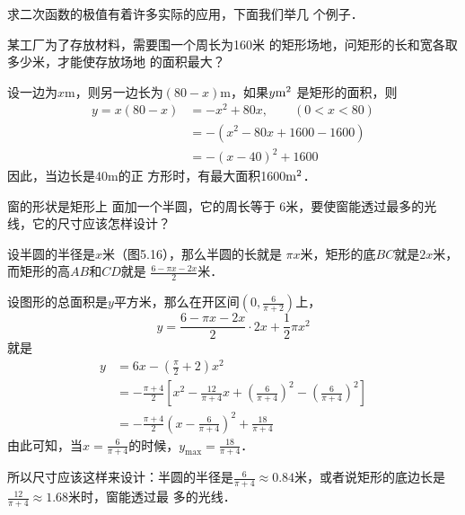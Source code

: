 求二次函数的极值有着许多实际的应用，下面我们举几
个例子．

\begin{example}
    某工厂为了存放材料，需要围一个周长为160米
的矩形场地，问矩形的长和宽各取多少米，才能使存放场地
的面积最大？
\end{example}

\begin{solution}
    设一边为$x$m，则另一边长为$(80-x)$m，如果$y{\rm m}^2$
是矩形的面积，则
\[\begin{split}
    y=x(80-x)&=-x^2+80x,\qquad (0<x<80)\\
    &=-(x^2-80x+1600-1600)\\
    &=-(x-40)^2+1600
\end{split}\]
因此，当边长是40m的正
方形时，有最大面积1600${\rm m}^2$．
\end{solution}

\begin{example}
    窗的形状是矩形上
面加一个半圆，它的周长等于
6米，要使窗能透过最多的光
线，它的尺寸应该怎样设计？
\end{example}

\begin{solution}
设半圆的半径是$x$米（图5.16），那么半圆的长就是
$\pi x$米，矩形的底$BC$就是$2x$米，而矩形的高$AB$和$CD$就是
$\frac{6-\pi x-2x}{2}$米．

\begin{figure}[htp]
    \centering
{}
    \caption{}
\end{figure}

设图形的总面积是$y$平方米，那么在开区间$\left(0,\frac{6}{\pi+2}\right)$上，
\[y=\frac{6-\pi x-2x}{2}\cdot 2x+\frac{1}{2}\pi x^2\]
就是
\[\begin{split}
    y&=6x-\left(\frac{\pi}{2}+2\right)x^2\\
    &=-\frac{\pi+4}{2}\left[x^2-\frac{12}{\pi+4}x+\left(\frac{6}{\pi+4}\right)^2-\left(\frac{6}{\pi+4}\right)^2\right]\\
    &=-\frac{\pi+4}{2}\left(x-\frac{6}{\pi+4}\right)^2+\frac{18}{\pi+4}
\end{split}\]
由此可知，当$x=\frac{6}{\pi+4}$的时候，$y_{\max}=\frac{18}{\pi+4}$．

所以尺寸应该这样来设计：半圆的半径是$\frac{6}{\pi+4}\approx 0.84$米，或者说矩形的底边长是$\frac{12}{\pi+4}\approx 1.68$米时，窗能透过最
多的光线．
\end{solution}

